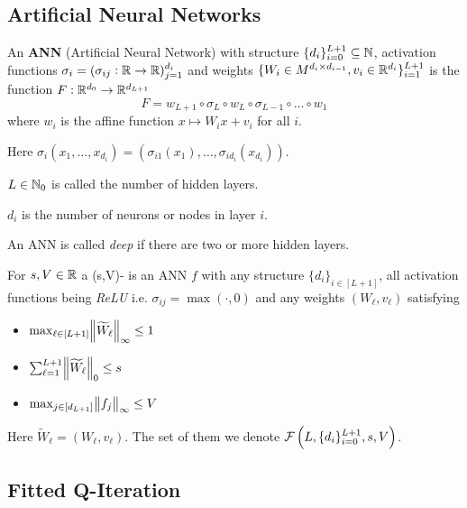 \documentclass{article}
\begin{document}


\subsection{Artificial Neural Networks}

\begin{defn}\label{def_ANN}
	An \textbf{ANN} (Artificial Neural Network) with structure
	$\{ d_i \}_{i=0}^{L+1} \subseteq \mathbb{N}$,
	activation functions $\sigma_i = (\sigma_{ij} : \mathbb{R} \to \mathbb{R})_{j=1}^{d_i}$
	and weights $\{ W_i \in M^{d_i \times d_{i-1}}, v_i \in \mathbb{R}^{d_i} \}_{i=1}^{L+1}$
	is the function $F:\mathbb{R}^{d_0} \to \mathbb{R}^{d_{L+1}}$ 
	\[ F = w_{L+1} \circ \sigma_L \circ w_L \circ \sigma_{L-1} \circ \dots \circ w_1 \]
	where $w_i$ is the affine function $x \mapsto W_i x + v_i$ for all $i$.

	Here $\sigma_i(x_1, \dots, x_{d_i})
	= (\sigma_{i1}(x_1), \dots, \sigma_{id_{i}}(x_{d_{i}}))$.

	$L \in \mathbb{N}_0$ is called the number of hidden layers.

	$d_i$ is the number of neurons or nodes in layer $i$.
\end{defn}

An ANN is called \emph{deep} if there are two or more hidden layers.

\begin{defn}
  For $s,V \in \mathbb{R}$ a (s,V)- is an ANN $f$
  with any structure $\{d_i\}_{i\in [L+1]}$,
  all activation functions being \emph{ReLU} i.e. $\sigma_{ij} = \max(\cdot, 0)$
  and any weights $(W_\ell, v_\ell)$
  satisfying
  \begin{multicols}{3}
    \begin{itemize}
      \item $\max_{\ell \in [L+1]} \norm{\widetilde{W}_\ell}_\infty \leq 1$
      \item $\sum_{\ell = 1}^{L+1} \norm{\widetilde{W}_\ell}_0 \leq s$
      \item $\max_{j \in [d_{L+1}]} \norm{f_j}_\infty \leq V$
    \end{itemize}
  \end{multicols}
  Here $\widetilde{W}_\ell = (W_\ell, v_\ell)$.
  The set of them we denote $\mathcal{F}\left(L, \{d_i\}_{i=0}^{L+1},s,V \right)$.
  \label{def:sparseReLU}
\end{defn}

\subsection{Fitted Q-Iteration}
\end{document}
